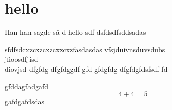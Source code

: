 \documentclass{article}
\begin{document}
\section{hello}

Han han sagde så 
d
hello
sdf
dsfdsdfsddsadas

sfdfsdcxzcxzcxzcxzcxzfasdasdas
vfsjduivnsduvsdubs\\
jfioosdfjisd\\
diovjsd
\newpage
dfgfdg
dfgfdggdf
gfd
gfdgfdg
dfgfdgfdsfsdf
fd

gfddagfadgafd
$$4 + 4 = 5$$
gafdgafdsdas



\end{document}
